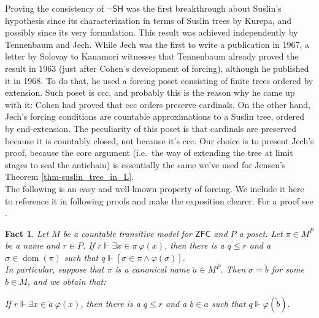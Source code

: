 \documentclass[11pt,a4paper]{report}
\newtheorem{fact}[theorem]{Fact}
\theoremstyle{definition}
\theoremstyle{num.custom-title}
\theoremstyle{custom-title}
\DeclareMathOperator{\dom}{dom}
\newcommand{\ZFC}{\ensuremath{\mathsf{ZFC}}\xspace}
\newcommand{\nSH}{\ensuremath{\neg\mathsf{SH}}\xspace}
\renewcommand{\phi}{\varphi}
\newcommand{\forces}{\Vdash}
\begin{document}
Proving the consistency of \nSH was the first breakthrough about Suslin's hypothesis since its characterization in terms of Suslin trees by Kurepa, and possibly since its very formulation. This result was achieved independently by Tennenbaum and Jech. While Jech was the first to write a publication in 1967, a letter by Solovay to Kanamori \cite{Kan2011} witnesses that Tennenbaum already proved the result in 1963 (just after Cohen's development of forcing), although he published it \cite{Ten1968} in 1968. To do that, he used a forcing poset consisting of finite trees ordered by extension. Such poset is ccc, and probably this is the reason why he came up with it: Cohen had proved that ccc orders preserve cardinals. On the other hand, Jech's forcing conditions are countable approximations to a Suslin tree, ordered by end-extension. The peculiarity of this poset is that cardinals are preserved because it is countably closed, not because it's ccc. Our choice is to present Jech's proof, because the core argument (i.e.\ the way of extending the tree at limit stages to seal the antichain) is essentially the same we've used for Jensen's Theorem \ref{thm-suslin_tree_in_L}.\\

The following is an easy and well-known property of forcing. We include it here to reference it in following proofs and make the exposition clearer. For a proof see \cite[p.\ 284]{Kun2013}.
\begin{fact}\label{fact-taking_out_of_forcing}
Let $M$ be a countable transitive model for \ZFC and $P$ a poset. Let $\pi \in M^P$ be a name and $r \in P$. If $r \forces \exists x \in \pi \ \phi(x)$, then there is a $q \leq r$ and a $\sigma \in \dom(\pi)$ such that $q \forces [\sigma \in \pi \wedge \phi(\sigma)]$.\\
In particular, suppose that $\pi$ is a canonical name $\check{a} \in M^P$. Then $\sigma = \check{b}$ for some $b \in M$, and we obtain that:
\begin{center}
If $r \forces \exists x \in \check{a} \ \phi(x)$, then there is a $q \leq r$ and a $b \in a$ such that $q \forces \phi(\check{b})$.
\end{center}
\end{fact}
\end{document}
